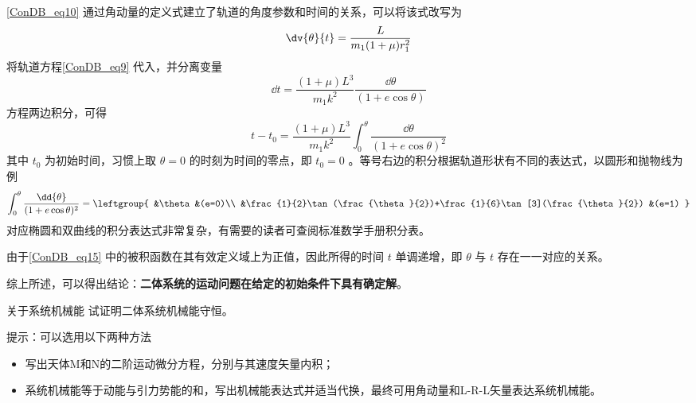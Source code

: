 \autoref{ConDB_eq10} 通过角动量的定义式建立了轨道的角度参数和时间的关系，可以将该式改写为
\begin{equation}
\dv{\theta}{t}=\frac{L}{ m_1(1+\mu)r_1^2}
\end{equation}
将轨道方程\autoref{ConDB_eq9} 代入，并分离变量
\begin{equation}
\dd{t}=\frac{(1+\mu)L^3}{ m_1k^2}\frac{\dd{\theta}}{(1+e\cos\theta)}
\end{equation}
方程两边积分，可得
\begin{equation}\label{ConDB_eq15}
t-t_0 = \frac{(1+\mu)L^3}{ m_1k^2}\int_0^{\theta} \frac{\dd{\theta}}{(1+e\cos\theta)^2}
\end{equation}
其中 $t_0$ 为初始时间，习惯上取 $\theta=0$ 的时刻为时间的零点，即 $t_0=0$ 。等号右边的积分根据轨道形状有不同的表达式，以圆形和抛物线为例
\begin{equation}
\int_0^{\theta} \frac{\dd{\theta}}{(1+e\cos\theta)^2} =
\leftgroup{
&\theta &(e=0)\\
&\frac{1}{2}\tan(\frac{\theta}{2})+\frac{1}{6}\tan[3](\frac{\theta}{2}) &(e=1)
} 
\end{equation}
对应椭圆和双曲线的积分表达式非常复杂，有需要的读者可查阅标准数学手册积分表。

由于\autoref{ConDB_eq15} 中的被积函数在其有效定义域上为正值，因此所得的时间 $t$ 单调递增，即 $\theta$ 与 $t$ 存在一一对应的关系。

综上所述，可以得出结论：\textbf{二体系统的运动问题在给定的初始条件下具有确定解}。

\begin{exercise}{关于系统机械能}\label{ConDB_exe1}
试证明二体系统机械能守恒。

提示：可以选用以下两种方法
\begin{itemize}
\item 写出天体M和N的二阶运动微分方程，分别与其速度矢量内积；
\item 系统机械能等于动能与引力势能的和，写出机械能表达式并适当代换，最终可用角动量和L-R-L矢量表达系统机械能。
\end{itemize}
\end{exercise}
